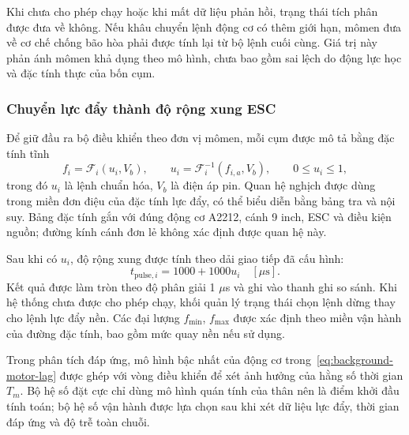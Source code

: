 Khi chưa cho phép chạy hoặc khi mất dữ liệu phản hồi, trạng thái tích phân được đưa về không. Nếu khâu chuyển lệnh động cơ có thêm giới hạn, mômen đưa về cơ chế chống bão hòa phải được tính lại từ bộ lệnh cuối cùng. Giá trị này phản ánh mômen khả dụng theo mô hình, chưa bao gồm sai lệch do động lực học và đặc tính thực của bốn cụm.

\subsubsection{Chuyển lực đẩy thành độ rộng xung ESC}

Để giữ đầu ra bộ điều khiển theo đơn vị mômen, mỗi cụm được mô tả bằng đặc tính tĩnh
\begin{equation}
	f_i=\mathcal F_i(u_i,V_b),\qquad
	u_i=\mathcal F_i^{-1}(f_{i,a},V_b),\qquad
	0\leq u_i\leq1,
	\label{eq:design-force-command-map}
\end{equation}
trong đó $u_i$ là lệnh chuẩn hóa, $V_b$ là điện áp pin. Quan hệ nghịch được dùng trong miền đơn điệu của đặc tính lực đẩy, có thể biểu diễn bằng bảng tra và nội suy. Bảng đặc tính gắn với đúng động cơ A2212, cánh 9 inch, ESC và điều kiện nguồn; đường kính cánh đơn lẻ không xác định được quan hệ này.

Sau khi có $u_i$, độ rộng xung được tính theo dải giao tiếp đã cấu hình:
\begin{equation}
	t_{\mathrm{pulse},i}
	=1000+1000u_i\quad[\mu\mathrm s].
	\label{eq:design-command-to-pwm}
\end{equation}
Kết quả được làm tròn theo độ phân giải 1 $\mu$s và ghi vào thanh ghi so sánh. Khi hệ thống chưa được cho phép chạy, khối quản lý trạng thái chọn lệnh dừng thay cho lệnh lực đẩy nền. Các đại lượng $f_{\min}$, $f_{\max}$ được xác định theo miền vận hành của đường đặc tính, bao gồm mức quay nền nếu sử dụng.

Trong phân tích đáp ứng, mô hình bậc nhất của động cơ trong~\eqref{eq:background-motor-lag} được ghép với vòng điều khiển để xét ảnh hưởng của hằng số thời gian $T_m$. Bộ hệ số đặt cực chỉ dùng mô hình quán tính của thân nên là điểm khởi đầu tính toán; bộ hệ số vận hành được lựa chọn sau khi xét dữ liệu lực đẩy, thời gian đáp ứng và độ trễ toàn chuỗi.
